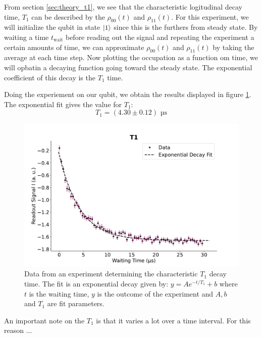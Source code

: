 From section \ref{sec:theory_t1}, we see that the characteristic logitudinal decay time, $T_1$ can be described by the $\rho_{00}(t)$ and $\rho_{11}(t)$. For this experiment, we will initialize the qubit in state $\ket{1}$ since this is the furthers from steady state. By waiting a time $t_{\text{wait}}$ before reading out the signal and repeating the experiment a certain amounts of time, we can approximate  $\rho_{00}(t)$ and $\rho_{11}(t)$ by taking the average at each time step. Now plotting the occupation as a function om time, we will opbatin a decaying function going toward the steady state. The exponential coefficient of this decay is the $T_1$ time. 


Doing the experiement on our qubit, we obtain the results displayed in figure \ref{fig:calibration_T_1_decay}. The exponential fit gives the value for $T_1$:
\begin{equation}
    T_1 = (4.30 \pm 0.12) \text{ µs}
\end{equation}

\begin{figure}
    \centering
    \includegraphics[]{Calibrations/Figures/T1.pdf}
    \caption{Data from an experiment determining the characteristic $T_1$ decay time. The fit is an exponential decay given by: $y = A e^{-t / T_1} + b$ where $t$ is the waiting time, $y$ is the outcome of the experiment and $A, b$ and $T_1$ are fit parameters.}
    \label{fig:calibration_T_1_decay}
\end{figure}

An important note on the $T_1$ is that it varies a lot over a time interval. For this reason ... 




